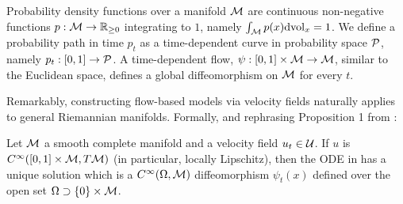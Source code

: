 \documentclass{fairmeta}
\renewcommand{\eqref}[1]{\labelcref{#1}}
\numberwithin{equation}{section}
\begin{document}
Probability density functions over a manifold ${\mathcal{M}}$ are continuous non-negative functions $p:{\mathcal{M}}\rightarrow\mathbb R_{\geq 0}$ integrating to $1$, namely $\int_{\mathcal{M}} p(x) \mathrm{d} \mathrm{vol}_x=1$.
We define a probability path in time $p_t$ as a time-dependent curve in probability space ${\mathcal{P}}$, namely $p_t:[0,1]\rightarrow{\mathcal{P}}$.
A time-dependent flow, $\psi:[0,1]\times {\mathcal{M}}\rightarrow{\mathcal{M}}$, similar to the Euclidean space, defines a global diffeomorphism on ${\mathcal{M}}$ for every $t$.

Remarkably, constructing flow-based models via velocity fields naturally applies to general Riemannian manifolds.
Formally, and rephrasing Proposition 1 from \cite{mathieu2020riemannian}:
\begin{myframe}
    \begin{theorem}\label{thm:riemannian_ode_existence_and_uniqueness}
    Let ${\mathcal{M}}$ a smooth complete manifold and a velocity field $u_t \in {\mathcal{U}}$. If $u$ is $C^\infty([0,1]\times{\mathcal{M}},T{\mathcal{M}})$ (in particular, locally Lipschitz), then the ODE in \eqref{e:flow} has a unique solution which is a  $C^\infty(\Omega,{\mathcal{M}})$ diffeomorphism $\psi_t(x)$ defined over the open set $\Omega \supset \left\{0\right\}\times {\mathcal{M}}$.
    \end{theorem}
\end{myframe}
\end{document}
